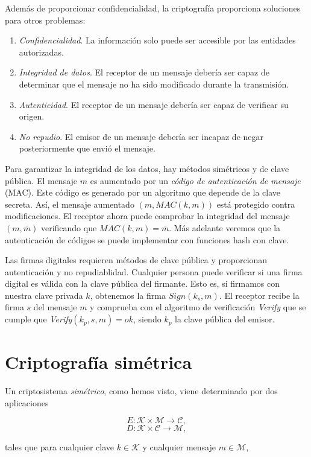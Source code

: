 Además de proporcionar confidencialidad, la criptografía proporciona soluciones para otros problemas:

\begin{enumerate}
    \item \emph{Confidencialidad}. La información solo puede ser accesible por las entidades autorizadas.
    \item \emph{Integridad de datos}. El receptor de un mensaje debería ser capaz de determinar que el mensaje no ha sido modificado durante la transmisión.
    \item \emph{Autenticidad}. El receptor de un mensaje debería ser capaz de verificar su origen.
    \item \emph{No repudio}. El emisor de un mensaje debería ser incapaz de negar posteriormente que envió el mensaje.
\end{enumerate}

Para garantizar la integridad de los datos, hay métodos simétricos y de clave pública. El mensaje $m$ es aumentado por un \emph{código de autenticación de mensaje} (MAC). Este código es generado por un algoritmo que depende de la clave secreta. Así, el mensaje aumentado $(m, MAC(k,m))$ está protegido contra modificaciones. El receptor ahora puede comprobar la integridad del mensaje $(m, \bar{m})$ verificando que $MAC(k, m) = \bar{m}$. Más adelante veremos que la autenticación de códigos se puede implementar con funciones hash con clave.

Las firmas digitales requieren métodos de clave pública y proporcionan autenticación y no repudiablidad. Cualquier persona puede verificar si una firma digital es válida con la clave pública del firmante. Esto es, si firmamos con nuestra clave privada $k$, obtenemos la firma $Sign(k_s, m)$. El receptor recibe la firma $s$ del mensaje $m$ y comprueba con el algoritmo de verificación \emph{Verify} que se cumple que \emph{Verify}$(k_p, s, m) = ok$, siendo $k_p$ la clave pública del emisor.

\section{Criptografía simétrica}

Un criptosistema \emph{simétrico}, como hemos visto, viene determinado por dos aplicaciones

$$E : \mathcal{K} \times \mathcal{M} \rightarrow \mathcal{C},$$
$$D : \mathcal{K} \times \mathcal{C} \rightarrow \mathcal{M},$$

tales que para cualquier clave $k \in \mathcal{K}$ y cualquier mensaje $m \in \mathcal{M}$,

